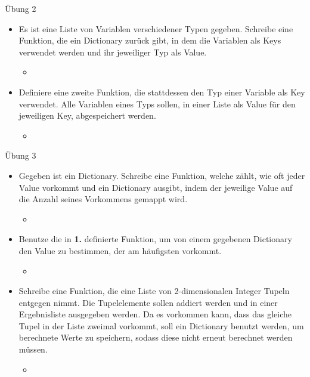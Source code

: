 \begin{frame}{Übung 2}
	\begin{itemize}
		\item[\textbf{1.}] Es ist eine Liste von Variablen verschiedener Typen gegeben. Schreibe eine Funktion, die ein Dictionary zurück gibt, in dem die Variablen als Keys verwendet werden und ihr jeweiliger Typ als Value.
		\begin{itemize}
			\item[\textbf{Bsp.:}] 
		\end{itemize}
		\item[\textbf{2.}] Definiere eine zweite Funktion, die stattdessen den Typ einer Variable als Key verwendet. Alle Variablen eines Typs sollen, in einer Liste als Value für den jeweiligen Key, abgespeichert werden.
		\begin{itemize}
			\item[\textbf{Bsp.:}]
		\end{itemize}
		\end{itemize}
\end{frame}

\begin{frame}{Übung 3}
	\begin{itemize}
		\item[\textbf{1.}]Gegeben ist ein Dictionary. Schreibe eine Funktion, welche zählt, wie oft jeder Value vorkommt und ein Dictionary ausgibt, indem der jeweilige Value auf die Anzahl seines Vorkommens gemappt wird.
		\begin{itemize}
			\item[\textbf{Bsp.:}]
		\end{itemize}
		\item[\textbf{2.}] Benutze die in \textbf{1.} definierte Funktion, um von einem gegebenen Dictionary den Value zu bestimmen, der am häufigsten vorkommt.
		\begin{itemize}
			\item[\textbf{Bsp.:}]
		\end{itemize}
	
		\pause
		\item[\textbf{Z}] Schreibe eine Funktion, die eine Liste von 2-dimensionalen Integer Tupeln entgegen nimmt. Die Tupelelemente sollen addiert werden und in einer Ergebnisliste ausgegeben werden. Da es vorkommen kann, dass das gleiche Tupel in der Liste zweimal vorkommt, soll ein Dictionary benutzt werden, um berechnete Werte zu speichern, sodass diese nicht erneut berechnet werden müssen.
		\begin{itemize}
			\item[\textbf{Bsp.:}]
		\end{itemize}
	\end{itemize}
\end{frame}



